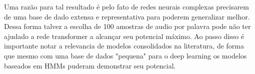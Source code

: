 \documentclass[
	12pt,				%
	openright,			%
	oneside,			%
	a4paper,			%
	chapter=TITLE,		%
	english,			%
	french,				%
	spanish,			%
	brazil				%
	]{abntex2}
\theoremstyle{definition}
\begin{document}
Uma razão para tal resultado é pelo fato de redes neurais complexas precisarem de uma base de dado extensa e representativa para poderem generalizar melhor. Dessa forma talvez a escolha de 100 amostras de audio por palavra pode não ter ajudado a rede transformer a alcançar seu potencial máximo. Ao passo disso é importante notar a relevancia de modelos consolidados na literatura, de forma que mesmo com uma base de dados "pequena" para o deep learning os modelos baseados em HMMs puderam demonstrar seu potencial.
\postextual


\end{document}
